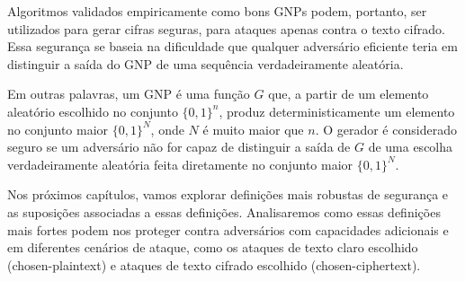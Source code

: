 \begin{center}
\end{center}

Algoritmos validados empiricamente como bons GNPs podem, portanto, ser utilizados para gerar cifras seguras, para ataques apenas contra o texto cifrado.
Essa segurança se baseia na dificuldade que qualquer adversário eficiente teria em distinguir a saída do GNP de uma sequência verdadeiramente aleatória.

Em outras palavras, um GNP é uma função $G$ que, a partir de um elemento aleatório escolhido no conjunto $\{0,1\}^n$, produz deterministicamente um elemento no conjunto maior $\{0,1\}^N$, onde $N$ é muito maior que $n$.
O gerador é considerado seguro se um adversário não for capaz de distinguir a saída de $G$ de uma escolha verdadeiramente aleatória feita diretamente no conjunto maior $\{0,1\}^N$.

Nos próximos capítulos, vamos explorar definições mais robustas de segurança e as suposições associadas a essas definições.
Analisaremos como essas definições mais fortes podem nos proteger contra adversários com capacidades adicionais e em diferentes cenários de ataque, como os ataques de texto claro escolhido (chosen-plaintext) e ataques de texto cifrado escolhido (chosen-ciphertext).

